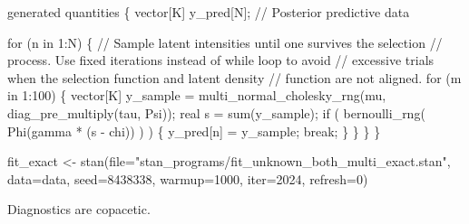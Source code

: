 \documentclass[
  letterpaper,
  DIV=11,
  numbers=noendperiod]{scrartcl}
\newenvironment{Shaded}{\begin{snugshade}}{\end{snugshade}}
\newcommand{\AttributeTok}[1]{\textcolor[rgb]{0.40,0.45,0.13}{#1}}
\newcommand{\CommentTok}[1]{\textcolor[rgb]{0.37,0.37,0.37}{#1}}
\newcommand{\ControlFlowTok}[1]{\textcolor[rgb]{0.00,0.23,0.31}{#1}}
\newcommand{\DataTypeTok}[1]{\textcolor[rgb]{0.68,0.00,0.00}{#1}}
\newcommand{\DecValTok}[1]{\textcolor[rgb]{0.68,0.00,0.00}{#1}}
\newcommand{\FunctionTok}[1]{\textcolor[rgb]{0.28,0.35,0.67}{#1}}
\newcommand{\KeywordTok}[1]{\textcolor[rgb]{0.00,0.23,0.31}{#1}}
\newcommand{\NormalTok}[1]{\textcolor[rgb]{0.00,0.23,0.31}{#1}}
\newcommand{\OtherTok}[1]{\textcolor[rgb]{0.00,0.23,0.31}{#1}}
\newcommand{\SpecialCharTok}[1]{\textcolor[rgb]{0.37,0.37,0.37}{#1}}
\newcommand{\StringTok}[1]{\textcolor[rgb]{0.13,0.47,0.30}{#1}}
\begin{document}
\begin{codelisting}
\begin{Shaded}
\begin{Highlighting}[]
\KeywordTok{generated quantities}\NormalTok{ \{}
  \DataTypeTok{vector}\NormalTok{[K] y\_pred[N]; }\CommentTok{// Posterior predictive data}
  
  \ControlFlowTok{for}\NormalTok{ (n }\ControlFlowTok{in} \DecValTok{1}\NormalTok{:N) \{}
    \CommentTok{// Sample latent intensities until one survives the selection}
    \CommentTok{// process.  Use fixed iterations instead of while loop to avoid }
    \CommentTok{// excessive trials when the selection function and latent density }
    \CommentTok{// function are not aligned.}
    \ControlFlowTok{for}\NormalTok{ (m }\ControlFlowTok{in} \DecValTok{1}\NormalTok{:}\DecValTok{100}\NormalTok{) \{}
      \DataTypeTok{vector}\NormalTok{[K] y\_sample }
\NormalTok{        = multi\_normal\_cholesky\_rng(mu, diag\_pre\_multiply(tau, Psi));}
      \DataTypeTok{real}\NormalTok{ s = sum(y\_sample);}
      \ControlFlowTok{if}\NormalTok{ ( bernoulli\_rng( Phi(gamma * (s {-} chi)) ) ) \{}
\NormalTok{        y\_pred[n] = y\_sample;}
        \ControlFlowTok{break}\NormalTok{;}
\NormalTok{      \}}
\NormalTok{    \}}
\NormalTok{  \}}
\NormalTok{\}}
\end{Highlighting}
\end{Shaded}

\end{codelisting}

\begin{Shaded}
\begin{Highlighting}[]
\NormalTok{fit\_exact }\OtherTok{\textless{}{-}} \FunctionTok{stan}\NormalTok{(}\AttributeTok{file=}\StringTok{"stan\_programs/fit\_unknown\_both\_multi\_exact.stan"}\NormalTok{,}
                  \AttributeTok{data=}\NormalTok{data, }\AttributeTok{seed=}\DecValTok{8438338}\NormalTok{,}
                  \AttributeTok{warmup=}\DecValTok{1000}\NormalTok{, }\AttributeTok{iter=}\DecValTok{2024}\NormalTok{, }\AttributeTok{refresh=}\DecValTok{0}\NormalTok{)}
\end{Highlighting}
\end{Shaded}

Diagnostics are copacetic.

\begin{Shaded}
\end{Shaded}
\end{document}

